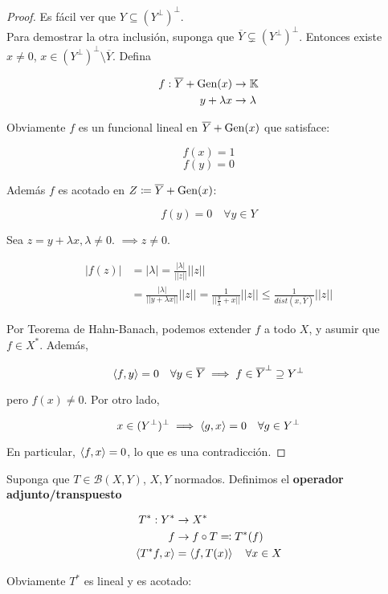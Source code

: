 \begin{proof}
   Es fácil ver que $Y\subseteq (Y^\perp)^\perp$.\\
   Para demostrar la otra inclusión, suponga que $\overline{Y}\subsetneq (Y^\perp)^\perp$. Entonces existe $x\neq 0$, $x\in (Y^\perp)^\perp\setminus \overline{Y}$. Defina

   \begin{align*}
       f:\overline{Y}+\operatorname{Gen}(x)&\to\mathbb{K}\\
       y+\lambda x&\to \lambda
   \end{align*}

   Obviamente $f$ es un funcional lineal en $\overline{Y}+\operatorname{Gen}(x)$ que satisface:

   \[f(x)=1\]
   \[f(y)=0\]

   Además $f$ es acotado en $Z\coloneqq \overline{Y}+\operatorname{Gen}(x)$:

   \[f(y)=0\quad\forall y\in Y\]

   Sea $z=y+\lambda x,\lambda\neq 0$. $\implies z\neq 0$.

   \begin{align*}
       |f(z)|&=|\lambda|=\frac{|\lambda|}{||z||}||z||\\
       &=\frac{|\lambda|}{||y+\lambda x||}||z||=\frac{1}{||\frac{y}{\lambda}+x||}||z||\leq \frac{1}{dist(x,\overline{Y})}||z||
   \end{align*}

   Por Teorema de Hahn-Banach, podemos extender $f$ a todo $X$, y asumir que $f\in X^*$. Además,

   \[\left\langle f,y\right\rangle=0\quad\forall y\in \overline{Y}\implies f\in \overline{Y}^\perp\supseteq Y^\perp\]

   pero $f(x)\neq 0$. Por otro lado, 

   \[x\in (Y^\perp)^\perp\implies \left\langle g,x\right\rangle=0\quad\forall g\in Y^\perp\]

   En particular, $\left\langle f,x\right\rangle=0$, lo que es una contradicción.
\end{proof}

Suponga que $T\in \mathcal{B}(X,Y)$, $X,Y$ normados. Definimos el \textbf{operador adjunto/transpuesto}

\begin{align*}
   T^*:Y^*&\to X^*\\
   f&\to f\circ T\eqqcolon T^*(f)\\
   \left\langle T^*f,x\right\rangle&=\left\langle f,T(x)\right\rangle\quad\forall x\in X
\end{align*}

Obviamente $T^*$ es lineal y es acotado:

